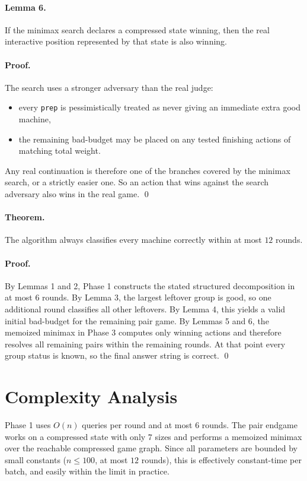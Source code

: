 \documentclass[11pt]{article}
\begin{document}
\paragraph{Lemma 6.}
If the minimax search declares a compressed state winning, then the real interactive position represented by that state is also winning.

\paragraph{Proof.}
The search uses a stronger adversary than the real judge:
\begin{itemize}[leftmargin=*]
    \item every \texttt{prep} is pessimistically treated as never giving an immediate extra good machine,
    \item the remaining bad-budget may be placed on any tested finishing actions of matching total weight.
\end{itemize}
Any real continuation is therefore one of the branches covered by the minimax search, or a strictly easier one. So an action that wins against the search adversary also wins in the real game. \qed

\paragraph{Theorem.}
The algorithm always classifies every machine correctly within at most $12$ rounds.

\paragraph{Proof.}
By Lemmas 1 and 2, Phase 1 constructs the stated structured decomposition in at most $6$ rounds. By Lemma 3, the largest leftover group is good, so one additional round classifies all other leftovers. By Lemma 4, this yields a valid initial bad-budget for the remaining pair game. By Lemmas 5 and 6, the memoized minimax in Phase 3 computes only winning actions and therefore resolves all remaining pairs within the remaining rounds. At that point every group status is known, so the final answer string is correct. \qed

\section*{Complexity Analysis}

Phase 1 uses $O(n)$ queries per round and at most $6$ rounds. The pair endgame works on a compressed state with only $7$ sizes and performs a memoized minimax over the reachable compressed game graph. Since all parameters are bounded by small constants ($n \le 100$, at most $12$ rounds), this is effectively constant-time per batch, and easily within the limit in practice.
\end{document}
